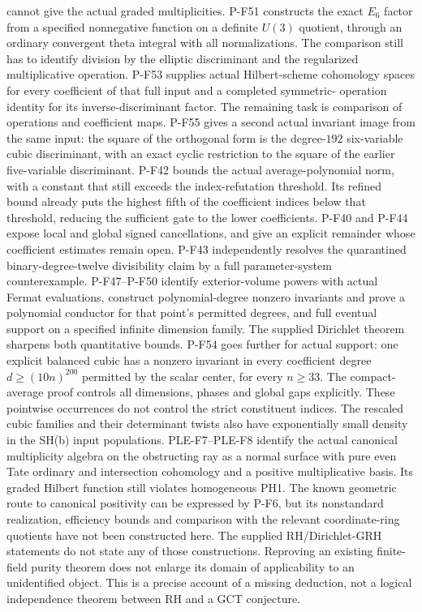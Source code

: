 cannot give the actual graded multiplicities.
P-F51 constructs the exact $E_6$ factor from a specified
nonnegative function on a definite $U(3)$ quotient, through
an ordinary convergent theta integral with all normalizations.
The comparison still has to identify division by the elliptic
discriminant and the regularized multiplicative operation.
P-F53 supplies actual Hilbert-scheme cohomology spaces for
every coefficient of that full input and a completed symmetric-
operation identity for its inverse-discriminant factor. The
remaining task is comparison of operations and coefficient maps.
P-F55 gives a second actual invariant image from the same input:
the square of the orthogonal form is the degree-$192$
six-variable cubic discriminant, with an exact cyclic restriction
to the square of the earlier five-variable discriminant.
P-F42 bounds the actual average-polynomial norm, with a constant
that still exceeds the index-refutation threshold. Its refined
bound already puts the highest fifth of the coefficient indices
below that threshold, reducing the sufficient gate to the lower
coefficients. P-F40 and
P-F44 expose local and global signed cancellations, and give
an explicit remainder whose coefficient estimates remain open.
P-F43 independently resolves the quarantined binary-degree-twelve
divisibility claim by a full parameter-system counterexample.
P-F47--P-F50 identify exterior-volume powers with actual Fermat
evaluations, construct polynomial-degree nonzero invariants and
prove a polynomial conductor for that point's permitted degrees,
and full eventual support on a specified infinite dimension family.
The supplied Dirichlet theorem sharpens both quantitative bounds.
P-F54 goes further for actual support: one explicit balanced
cubic has a nonzero invariant in every coefficient degree
$d\ge(10n)^{200}$ permitted by the scalar center, for every
$n\ge33$. The compact-average proof controls all dimensions,
phases and global gaps explicitly.
These pointwise occurrences do not control the strict constituent
indices. The rescaled cubic families and their determinant twists
also have exponentially small density in the SH(b) input populations.
PLE-F7--PLE-F8 identify the actual canonical multiplicity algebra on
the obstructing ray as a normal surface with pure even Tate ordinary
and intersection cohomology and a positive multiplicative basis.
Its graded Hilbert function still violates homogeneous PH1.
The known geometric route to
canonical positivity can be expressed by P-F6, but its nonstandard
realization, efficiency bounds and comparison with the relevant
coordinate-ring quotients have not been constructed here.
The supplied RH/Dirichlet-GRH statements do not state any of those
constructions. Reproving an existing finite-field purity theorem does
not enlarge its domain of applicability to an unidentified object.
This is a precise account of a missing deduction, not a logical
independence theorem between RH and a GCT conjecture.
